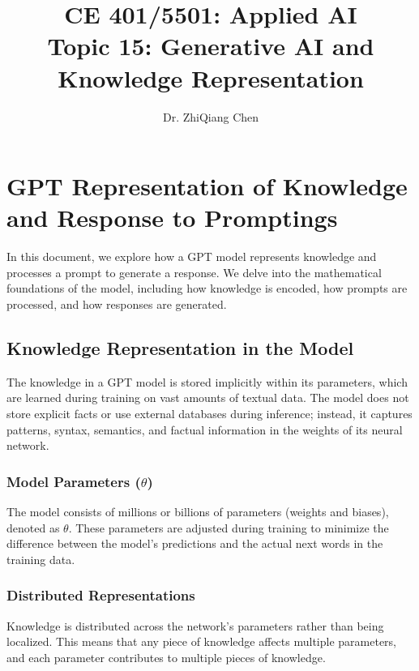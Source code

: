 \documentclass[12pt]{article}
\begin{document}
\doublespacing	

\title{CE 401/5501: Applied AI \\ \large Topic 15: Generative AI and Knowledge Representation}
\author{Dr. ZhiQiang Chen}
\date{}
\maketitle
\section{GPT Representation of  Knowledge and Response to Promptings}

In this document, we explore how a GPT model represents knowledge and processes a prompt to generate a response. We delve into the mathematical foundations of the model, including how knowledge is encoded, how prompts are processed, and how responses are generated.

\subsection{Knowledge Representation in the Model}

The knowledge in a GPT model is stored implicitly within its parameters, which are learned during training on vast amounts of textual data. The model does not store explicit facts or use external databases during inference; instead, it captures patterns, syntax, semantics, and factual information in the weights of its neural network.

\subsubsection{Model Parameters (\( \theta \))}

The model consists of millions or billions of parameters (weights and biases), denoted as \( \theta \). These parameters are adjusted during training to minimize the difference between the model's predictions and the actual next words in the training data.

\subsubsection{Distributed Representations}

Knowledge is distributed across the network's parameters rather than being localized. This means that any piece of knowledge affects multiple parameters, and each parameter contributes to multiple pieces of knowledge.
\end{document}
